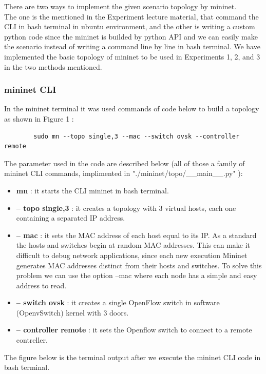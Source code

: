 There are two ways to implement the given scenario topology by mininet. \\
The one is the mentioned in the Experiment lecture material, that command the CLI in bash terminal in ubuntu environment, and the other is writing a custom python code since the mininet is builded by python API and we can easily make the scenario instead of writing a command line by line in bash terminal.
We have implemented the basic topology of mininet to be used in Experiments 1, 2, and 3 in the two methods mentioned.
\subsubsection*{mininet CLI}
In the mininet terminal it was used commands of code below to build a topology as shown in Figure 1 :
\begin{center}
    \begin{verbatim}
        sudo mn --topo single,3 --mac --switch ovsk --controller remote
    \end{verbatim}
\end{center}
\vspace{-4mm}
The parameter used in the code are described below (all of those a family of mininet CLI commands, implimented in "./mininet/topo/\_\_main\_\_.py" ):
\begin{itemize}
    \item \textbf{mn} : it starts the CLI mininet in bash terminal.
    \item \textbf{-- topo single,3} : it creates a topology with 3 virtual hosts, each one containing a separated IP address.
    \item \textbf{-- mac} : it sets the MAC address of each host equal to its IP. As a standard the hosts and switches begin at random MAC addresses. This can make it difficult to debug network applications, since each new execution Mininet generates MAC addresses distinct from their hosts and switches. To solve this problem we can use the option --mac where each node has a simple and easy address to read.
    \item \textbf{-- switch ovsk} : it creates a single OpenFlow switch in software (OpenvSwitch) kernel with 3 doors.
    \item \textbf{-- controller remote} : it sets the Openflow switch to connect to a remote contreller.
\end{itemize}
The figure below is the terminal output after we execute the mininet CLI code in bash terminal.\\

